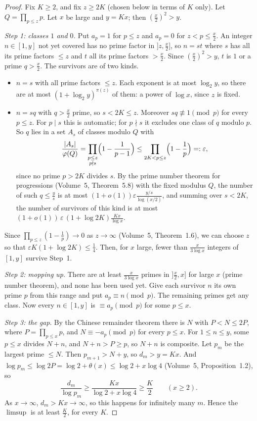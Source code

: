 \begin{proof}
Fix $K\ge2$, and fix $z\ge2K$ (chosen below in terms of $K$ only). Let $Q=\prod_{p\le z}p$. Let $x$ be large and $y=Kx$; then $(\frac x2)^2>y$.

\emph{Step 1: classes $1$ and $0$.} Put $a_p=1$ for $p\le z$ and $a_p=0$ for $z<p\le\frac x2$. An integer $n\in[1,y]$ not yet covered has no prime factor in
$]z,\frac x2]$, so $n=st$ where $s$ has all its prime factors $\le z$ and $t$ all its prime factors $>\frac x2$. Since $(\frac x2)^2>y$, $t$ is $1$ or a prime
$q>\frac x2$. The survivors are of two kinds.
\begin{itemize}
\item $n=s$ with all prime factors $\le z$. Each exponent is at most $\log_2y$, so there are at most $(1+\log_2y)^{\pi(z)}$ of them: a power of $\log x$,
since $z$ is fixed.
\item $n=sq$ with $q>\frac x2$ prime, so $s<2K\le z$. Moreover $sq\not\equiv1\pmod p$ for every $p\le z$. For $p\mid s$ this is automatic; for $p\nmid s$ it
excludes one class of $q$ modulo $p$. So $q$ lies in a set $A_s$ of classes modulo $Q$ with
\[
\frac{|A_s|}{\varphi(Q)}=\prod_{\substack{p\le z\\p\nmid s}}\Bigl(1-\frac1{p-1}\Bigr)\le\prod_{2K<p\le z}\Bigl(1-\frac1p\Bigr)=:\varepsilon,
\]
since no prime $p>2K$ divides $s$. By the prime number theorem for progressions (Volume~5, Theorem~5.8) with the fixed modulus $Q$, the number of such
$q\le\frac ys$ is at most $(1+o(1))\varepsilon\frac{y/s}{\log(x/2)}$, and summing over $s<2K$, the number of survivors of this kind is at most
$(1+o(1))\,\varepsilon\,(1+\log2K)\frac{Kx}{\log x}$.
\end{itemize}
Since $\prod_{p\le z}(1-\frac1p)\to0$ as $z\to\infty$ (Volume~5, Theorem~1.6), we can choose $z$ so that $\varepsilon K(1+\log2K)\le\frac14$. Then, for $x$ large,
fewer than $\frac x{3\log x}$ integers of $[1,y]$ survive Step~1.

\emph{Step 2: mopping up.} There are at least $\frac x{3\log x}$ primes in $]\frac x2,x]$ for large $x$ (prime number theorem), and none has been used yet.
Give each survivor $n$ its own prime $p$ from this range and put $a_p\equiv n\pmod p$. The remaining primes get any class. Now every $n\in[1,y]$ is
$\equiv a_p\pmod p$ for some $p\le x$.

\emph{Step 3: the gap.} By the Chinese remainder theorem there is $N$ with $P<N\le2P$, where $P=\prod_{p\le x}p$, and $N\equiv-a_p\pmod p$ for every
$p\le x$. For $1\le n\le y$, some $p\le x$ divides $N+n$, and $N+n>P\ge p$, so $N+n$ is composite. Let $p_m$ be the largest prime $\le N$. Then
$p_{m+1}>N+y$, so $d_m>y=Kx$. And $\log p_m\le\log2P=\log2+\theta(x)\le\log2+x\log4$ (Volume~5, Proposition~1.2), so
\[
\frac{d_m}{\log p_m}\ge\frac{Kx}{\log2+x\log4}\ge\frac K2\qquad(x\ge2).
\]
As $x\to\infty$, $d_m>Kx\to\infty$, so this happens for infinitely many $m$. Hence the $\limsup$ is at least $\frac K2$, for every $K$.
\end{proof}

